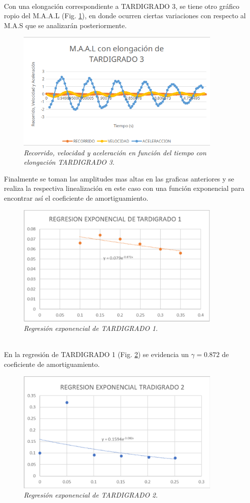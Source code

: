 \documentclass[spanish,notitlepage,letterpaper, 12pt]{article}
\begin{document}
\\
Con una elongación correspondiente a TARDIGRADO 3, se tiene otro gráfico ropio del M.A.A.L (Fig. \ref{Figura 6}), en donde ocurren ciertas variaciones con respecto al M.A.S que se analizarán posteriormente.
\newpage
\begin{figure}[h]
    \centering
    \includegraphics[width=10.0cm]{images/tardigrado3.png}
    \caption{\textit{Recorrido, velocidad y aceleración en función del tiempo con elongación TARDIGRADO 3.}}
    \label{Figura 6}
\end{figure}
Finalmente se toman las amplitudes mas altas en las graficas anteriores y se realiza la respectiva linealización en este caso con una función exponencial para encontrar así el coeficiente de amortiguamiento.
\begin{figure}[h]
    \centering
    \includegraphics[width=10.0cm]{images/regresion-tardigrado1.png}
    \caption{\textit{Regresión exponencial de TARDIGRADO 1.}}
    \label{Figura 7}
\end{figure}
\\
En la regresión de TARDIGRADO 1 (Fig. \ref{Figura 7}) se evidencia un $\gamma=0.872$ de coeficiente de amortiguamiento.
\newpage
\begin{figure}[h]
    \centering
    \includegraphics[width=10.0cm]{images/regresion-tardigrado2.png}
    \caption{\textit{Regresión exponencial de TARDIGRADO 2.}}
    \label{Figura 8}
\end{figure}
\end{document}
